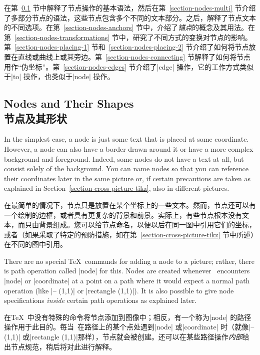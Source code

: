 在第~\ref{section-nodes-basic} 节中解释了节点操作的基本语法，然后在第~\ref{section-nodes-multi} 节介绍了多部分节点的语法，这些节点包含多个不同的文本部分。之后，解释了节点文本的不同选项。在第~\ref{section-nodes-anchors} 节中，介绍了\emph{锚点}的概念及其用法。在第~\ref{section-nodes-transformations} 节中，研究了不同方式的变换对节点的影响。第~\ref{section-nodes-placing-1} 节和~\ref{section-nodes-placing-2} 节介绍了如何将节点放置在直线或曲线上或其旁边。第~\ref{section-nodes-connecting} 节解释了如何将节点用作“伪坐标”。第~\ref{section-nodes-edges} 节介绍了|edge| 操作，它的工作方式类似于|to| 操作，也类似于|node| 操作。


\subsection{Nodes and Their Shapes\\节点及其形状}
\label{section-nodes-basic}

In the simplest case, a node is just some text that is placed at some
coordinate. However, a node can also have a border drawn around it or have a
more complex background and foreground. Indeed, some nodes do not have a text
at all, but consist solely of the background. You can name nodes so that you
can reference their coordinates later in the same picture or, if certain
precautions are taken as explained in Section~\ref{section-cross-picture-tikz},
also in different pictures.

在最简单的情况下，节点只是放置在某个坐标上的一些文本。然而，节点还可以有一个绘制的边框，或者具有更复杂的背景和前景。实际上，有些节点根本没有文本，而只由背景组成。您可以给节点命名，以便以后在同一图中引用它们的坐标，或者（如果采取了特定的预防措施，如在第~\ref{section-cross-picture-tikz} 节中所述）在不同的图中引用。

There are no special \TeX\ commands for adding a node to a picture; rather,
there is path operation called |node| for this. Nodes are created whenever
\tikzname\ encounters |node| or |coordinate| at a point on a path where it
would expect a normal path operation (like |-- (1,1)| or |rectangle (1,1)|). It
is also possible to give node specifications \emph{inside} certain path
operations as explained later.

在\TeX\ 中没有特殊的命令将节点添加到图像中；相反，有一个称为|node| 的路径操作用于此目的。每当\tikzname\ 在路径上的某个点处遇到|node| 或|coordinate| 时（就像|-- (1,1)| 或|rectangle (1,1)|那样），节点就会被创建。还可以在某些路径操作\emph{内部}给出节点规范，稍后将对此进行解释。

